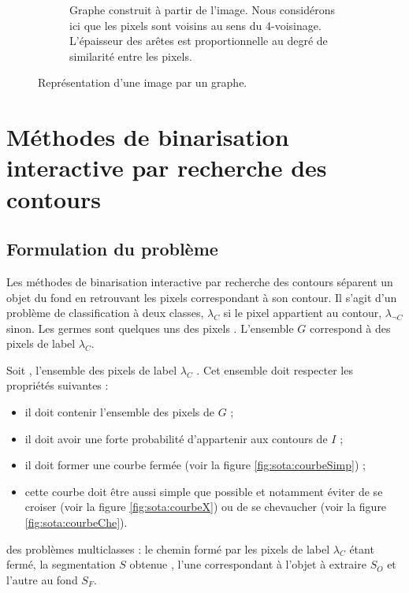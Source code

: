 \begin{figure}[htb]
\begin{subfigure}[t]{0.3\textwidth}
		 \caption{Graphe construit à partir de l'image. Nous considérons ici que les pixels
		 sont voisins au sens du 4-voisinage. L'épaisseur des arêtes est proportionnelle au degré de similarité entre les pixels.}
			\label{fig:sota::img_graph1}
	\end{subfigure}
	\caption{Représentation d'une image par un graphe.}
	\label{fig:sota:im_to_g}
\end{figure}

\section{Méthodes de binarisation interactive par recherche des contours}

\subsection{Formulation du problème}

Les méthodes de binarisation interactive par recherche des contours séparent un objet du fond en retrouvant les pixels correspondant à son contour. Il s'agit d'un problème de classification à deux classes,  $\lambda_{C}$ si le pixel appartient au contour,  $\lambda_{\neg C}$ sinon. Les germes sont quelques uns des pixels . L'ensemble $G$ correspond  à des pixels de label $\lambda_{C}$. 

Soit , l'ensemble des pixels de label $\lambda_{C}$ . Cet ensemble doit respecter les propriétés suivantes :
\begin{itemize}
\item il doit contenir l'ensemble des pixels de $G$ ;
\item il doit avoir une forte probabilité d'appartenir aux contours de $I$ ;
\item il doit former une courbe fermée (voir la figure \ref{fig:sota:courbeSimp}) ;
\item cette courbe doit être aussi simple que possible et notamment éviter de se croiser (voir la figure \ref{fig:sota:courbeX}) ou de se chevaucher (voir la figure \ref{fig:sota:courbeChe}).
\end{itemize} 

 des problèmes multiclasses : le chemin formé par les pixels de label  $\lambda_{C}$ étant fermé, la segmentation $S$ obtenue , l'une correspondant à l'objet à extraire $S_{O}$ et l'autre au fond $S_{F}$.  

